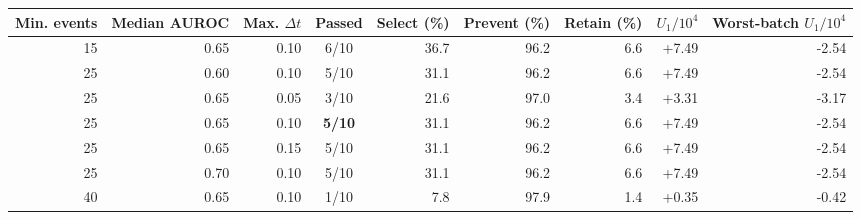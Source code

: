 \begin{tabular}{rrrcrrrrr}
\toprule
Min. events & Median AUROC & Max. $\Delta t$ & Passed & Select (\%) & Prevent (\%) & Retain (\%) & $U_1/10^4$ & Worst-batch $U_1/10^4$ \\
\midrule
15 & 0.65 & 0.10 & 6/10 & 36.7 & 96.2 & 6.6 & +7.49 & -2.54 \\
25 & 0.60 & 0.10 & 5/10 & 31.1 & 96.2 & 6.6 & +7.49 & -2.54 \\
25 & 0.65 & 0.05 & 3/10 & 21.6 & 97.0 & 3.4 & +3.31 & -3.17 \\
25 & 0.65 & 0.10 & \textbf{5/10} & 31.1 & 96.2 & 6.6 & +7.49 & -2.54 \\
25 & 0.65 & 0.15 & 5/10 & 31.1 & 96.2 & 6.6 & +7.49 & -2.54 \\
25 & 0.70 & 0.10 & 5/10 & 31.1 & 96.2 & 6.6 & +7.49 & -2.54 \\
40 & 0.65 & 0.10 & 1/10 & 7.8 & 97.9 & 1.4 & +0.35 & -0.42 \\
\bottomrule
\end{tabular}
